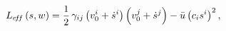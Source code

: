 \begin{equation}
L_{e\!f\!f}\left( s,w\right) =\frac{1}{2}\,\gamma _{ij}\left( v_{0}^{i}+\dot{%
s}^{i}\right) \left( v_{0}^{j}+\dot{s}^{j}\right) -\bar{u}\left(
c_{i}s^{i}\right) ^{2},  \label{Leff}
\end{equation}

